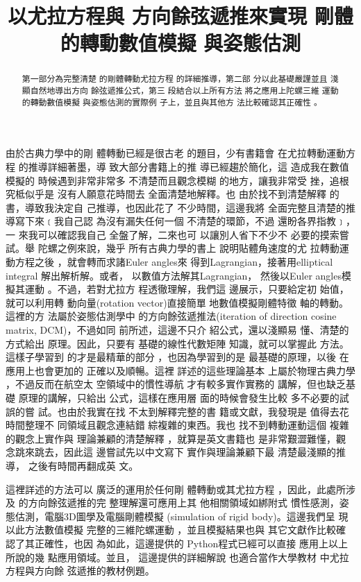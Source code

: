 \documentclass[12pt,a4paper]{article}
\begin{document}
\title{\bigskip \textbf{以尤拉方程與%
方向餘弦遞推來實現%
剛體的轉動數值模擬%
與姿態估測}}
\author{}
\maketitle

\begin{abstract}
第一部分為完整清楚%
的剛體轉動尤拉方程%
的詳細推導，第二部%
分以此基礎嚴謹並且%
淺顯自然地導出方向%
餘弦遞推公式，第三%
段結合以上所有方法%
將之應用上陀螺三維%
運動的轉動數值模擬%
與姿態估測的實際例%
子上，並且與其他方%
法比較確認其正確性%
。
\end{abstract}

由於古典力學中的剛%
體轉動已經是很古老%
的題目，少有書籍會%
在尤拉轉動運動方程%
的推導詳細著墨，導%
致大部分書籍上的推%
導已經趨於簡化，這%
造成我在數值模擬的%
時候遇到非常非常多%
不清楚而且觀念模糊%
的地方，讓我非常受%
挫，追根究柢似乎是%
沒有人願意花時間去%
全面清楚地解釋。也%
由於找不到清楚解釋%
的書，導致我決定自%
己推導，也因此花了%
不少時間，這邊我將%
全面完整且清楚的推%
導寫下來﹝我自己認%
為沒有漏失任何一個%
不清楚的環節，不過%
還盼各界指教﹞，一%
來我可以確認我自己%
全盤了解，二來也可%
以讓別人省下不少不%
必要的摸索嘗試。舉%
陀螺之例來說，幾乎%
所有古典力學的書上%
說明貼體角速度的尤%
拉轉動運動方程之後%
，就會轉而求諸Euler angles來%
得到Lagrangian，接著用elliptical integral%
解出解析解。或者，%
以數值方法解其Lagrangian，%
然後以Euler angles模擬其運動%
。不過，若對尤拉方%
程透徹理解，我們這%
邊展示，只要給定初%
始值，就可以利用轉%
動向量(rotation vector)直接簡單%
地數值模擬剛體特徵%
軸的轉動。這裡的方%
法屬於姿態估測學中%
的方向餘弦遞推法(iteration
of direction cosine matrix, DCM)，不過如同%
前所述，這邊不只介%
紹公式，還以淺顯易%
懂、清楚的方式給出%
原理。因此，只要有%
基礎的線性代數矩陣%
知識，就可以掌握此%
方法。這樣子學習到%
的才是最精華的部分%
，也因為學習到的是%
最基礎的原理，以後%
在應用上也會更加的%
正確以及順暢。這裡%
詳述的這些理論基本%
上屬於物理古典力學%
，不過反而在航空太%
空領域中的慣性導航%
才有較多實作實務的%
講解，但也缺乏基礎%
原理的講解，只給出%
公式，這樣在應用層%
面的時候會發生比較%
多不必要的試誤的嘗%
試。也由於我實在找%
不太到解釋完整的書%
籍或文獻，我發現是%
值得去花時間整理不%
同領域且觀念連結錯%
綜複雜的東西。我也%
找不到轉動運動這個%
複雜的觀念上實作與%
理論兼顧的清楚解釋%
，就算是英文書籍也%
是非常艱澀難懂，觀%
念跳來跳去，因此這%
邊嘗試先以中文寫下%
實作與理論兼顧下最%
清楚最淺顯的推導，%
之後有時間再翻成英%
文。

這裡詳述的方法可以%
廣泛的運用於任何剛%
體轉動或其尤拉方程%
，因此，此處所涉及%
的方向餘弦遞推的完%
整理解還可應用上其%
他相關領域如綁附式%
慣性感測\cite[Ch 3.6.4]{titterton}，姿%
態估測，電腦3D圖學\cite[Ch
2.3]{pixarnote}及電腦剛體模擬%
(simulation of rigid body)。這邊我們呈%
現以此方法數值模擬%
完整的三維陀螺運動%
，並且模擬結果也與%
其它文獻\cite{hasbun}作比較確%
認了其正確性，也因%
為如此，這邊提供的%
Python程式已經可以直接%
應用上以上所說的幾%
點應用領域。並且，%
這邊提供的詳細解說%
也適合當作大學教材%
中尤拉方程與方向餘%
弦遞推的教材例題。
\end{document}
